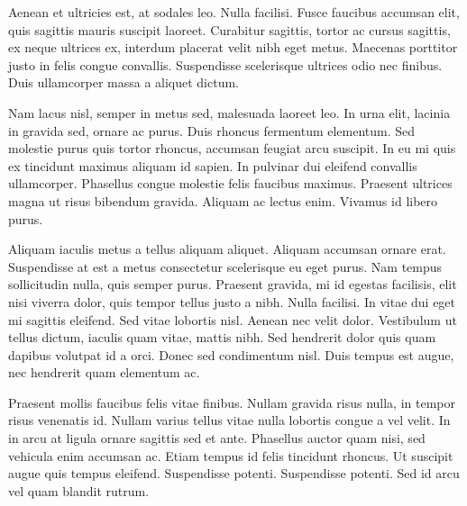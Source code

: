 \documentclass[10pt,openany]{book}
\begin{document}
Aenean et ultricies est, at sodales leo. Nulla facilisi. Fusce faucibus accumsan elit, quis sagittis mauris suscipit laoreet. Curabitur sagittis, tortor ac cursus sagittis, ex neque ultrices ex, interdum placerat velit nibh eget metus. Maecenas porttitor justo in felis congue convallis. Suspendisse scelerisque ultrices odio nec finibus. Duis ullamcorper massa a aliquet dictum.

Nam lacus nisl, semper in metus sed, malesuada laoreet leo. In urna elit, lacinia in gravida sed, ornare ac purus. Duis rhoncus fermentum elementum. Sed molestie purus quis tortor rhoncus, accumsan feugiat arcu suscipit. In eu mi quis ex tincidunt maximus aliquam id sapien. In pulvinar dui eleifend convallis ullamcorper. Phasellus congue molestie felis faucibus maximus. Praesent ultrices magna ut risus bibendum gravida. Aliquam ac lectus enim. Vivamus id libero purus.

Aliquam iaculis metus a tellus aliquam aliquet. Aliquam accumsan ornare erat. Suspendisse at est a metus consectetur scelerisque eu eget purus. Nam tempus sollicitudin nulla, quis semper purus. Praesent gravida, mi id egestas facilisis, elit nisi viverra dolor, quis tempor tellus justo a nibh. Nulla facilisi. In vitae dui eget mi sagittis eleifend. Sed vitae lobortis nisl. Aenean nec velit dolor. Vestibulum ut tellus dictum, iaculis quam vitae, mattis nibh. Sed hendrerit dolor quis quam dapibus volutpat id a orci. Donec sed condimentum nisl. Duis tempus est augue, nec hendrerit quam elementum ac.

Praesent mollis faucibus felis vitae finibus. Nullam gravida risus nulla, in tempor risus venenatis id. Nullam varius tellus vitae nulla lobortis congue a vel velit. In in arcu at ligula ornare sagittis sed et ante. Phasellus auctor quam nisi, sed vehicula enim accumsan ac. Etiam tempus id felis tincidunt rhoncus. Ut suscipit augue quis tempus eleifend. Suspendisse potenti. Suspendisse potenti. Sed id arcu vel quam blandit rutrum. 

\storyend[Ultimus]

\vfill

\theendnotes

\myendpage
\end{document}

